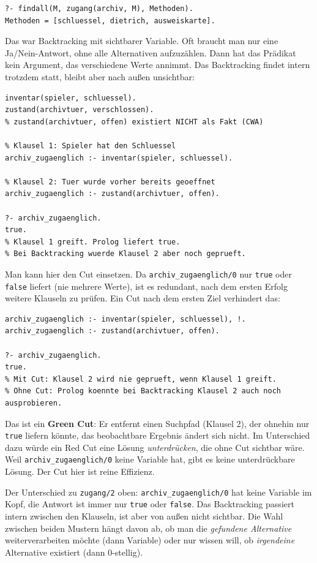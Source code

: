 \documentclass[parskip=half,a4paper,11pt]{scrreprt}
\begin{document}
\begin{lstlisting}[caption={}]
?- findall(M, zugang(archiv, M), Methoden).
Methoden = [schluessel, dietrich, ausweiskarte].
\end{lstlisting}
Das war Backtracking mit sichtbarer Variable. Oft braucht man nur eine Ja/Nein-Antwort, ohne alle Alternativen aufzuzählen. Dann hat das Prädikat kein Argument, das verschiedene Werte annimmt. Das Backtracking findet intern trotzdem statt, bleibt aber nach außen unsichtbar:
\begin{lstlisting}[caption={}]
% Spielzustand:
inventar(spieler, schluessel).
zustand(archivtuer, verschlossen).
% zustand(archivtuer, offen) existiert NICHT als Fakt (CWA)

% Klausel 1: Spieler hat den Schluessel
archiv_zugaenglich :- inventar(spieler, schluessel).

% Klausel 2: Tuer wurde vorher bereits geoeffnet
archiv_zugaenglich :- zustand(archivtuer, offen).

?- archiv_zugaenglich.
true.
% Klausel 1 greift. Prolog liefert true.
% Bei Backtracking wuerde Klausel 2 aber noch geprueft.
\end{lstlisting}
Man kann hier den Cut einsetzen. Da \texttt{archiv\_zugaenglich/0} nur \texttt{true} oder \texttt{false} liefert (nie mehrere Werte), ist es redundant, nach dem ersten Erfolg weitere Klauseln zu prüfen. Ein Cut nach dem ersten Ziel verhindert das:
\begin{lstlisting}[caption={}]
archiv_zugaenglich :- inventar(spieler, schluessel), !.
archiv_zugaenglich :- zustand(archivtuer, offen).

?- archiv_zugaenglich.
true.
% Mit Cut: Klausel 2 wird nie geprueft, wenn Klausel 1 greift.
% Ohne Cut: Prolog koennte bei Backtracking Klausel 2 auch noch ausprobieren.
\end{lstlisting}
Das ist ein \textbf{Green Cut}: Er entfernt einen Suchpfad (Klausel 2), der ohnehin nur \texttt{true} liefern könnte, das beobachtbare Ergebnis ändert sich nicht. Im Unterschied dazu würde ein Red Cut eine Lösung \emph{unterdrücken}, die ohne Cut sichtbar wäre. Weil \texttt{archiv\_zugaenglich/0} keine Variable hat, gibt es keine unterdrückbare Lösung. Der Cut hier ist reine Effizienz.

Der Unterschied zu \texttt{zugang/2} oben: \texttt{archiv\_zugaenglich/0} hat keine Variable im Kopf, die Antwort ist immer nur \texttt{true} oder \texttt{false}. Das Backtracking passiert intern zwischen den Klauseln, ist aber von außen nicht sichtbar. Die Wahl zwischen beiden Mustern hängt davon ab, ob man die \emph{gefundene Alternative} weiterverarbeiten möchte (dann Variable) oder nur wissen will, ob \emph{irgendeine} Alternative existiert (dann 0-stellig).
\end{document}
